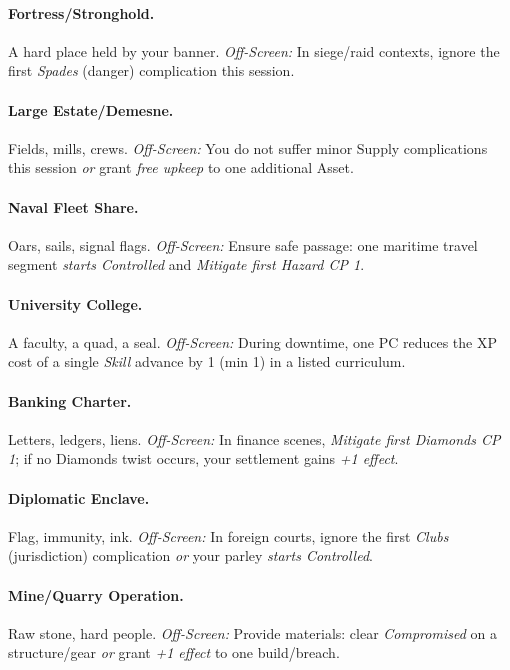 \documentclass[11pt]{article}
\begin{document}
\paragraph{Fortress/Stronghold.} A hard place held by your banner.
\emph{Off-Screen:} In siege/raid contexts, ignore the first \emph{Spades} (danger) complication this session.

\paragraph{Large Estate/Demesne.} Fields, mills, crews.
\emph{Off-Screen:} You do not suffer minor Supply complications this session \emph{or} grant \emph{free upkeep} to one additional Asset.

\paragraph{Naval Fleet Share.} Oars, sails, signal flags.
\emph{Off-Screen:} Ensure safe passage: one maritime travel segment \emph{starts Controlled} and \emph{Mitigate first Hazard CP 1}.

\paragraph{University College.} A faculty, a quad, a seal.
\emph{Off-Screen:} During downtime, one PC reduces the XP cost of a single \emph{Skill} advance by 1 (min 1) in a listed curriculum.

\paragraph{Banking Charter.} Letters, ledgers, liens.
\emph{Off-Screen:} In finance scenes, \emph{Mitigate first Diamonds CP 1}; if no Diamonds twist occurs, your settlement gains \emph{+1 effect}.

\paragraph{Diplomatic Enclave.} Flag, immunity, ink.
\emph{Off-Screen:} In foreign courts, ignore the first \emph{Clubs} (jurisdiction) complication \emph{or} your parley \emph{starts Controlled}.

\paragraph{Mine/Quarry Operation.} Raw stone, hard people.
\emph{Off-Screen:} Provide materials: clear \emph{Compromised} on a structure/gear \emph{or} grant \emph{+1 effect} to one build/breach.
\end{document}
